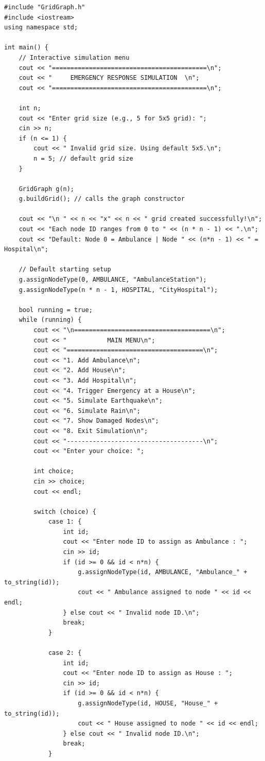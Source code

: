 \documentclass[12pt,a4paper]{report}
\begin{document}
\begin{lstlisting}[style=cpp, caption={main.cpp – Disaster Management System Simulation}]
#include "GridGraph.h"
#include <iostream>
using namespace std;

int main() {
    // Interactive simulation menu
    cout << "==========================================\n";
    cout << "     EMERGENCY RESPONSE SIMULATION  \n";
    cout << "==========================================\n";

    int n;
    cout << "Enter grid size (e.g., 5 for 5x5 grid): ";
    cin >> n;
    if (n <= 1) {
        cout << " Invalid grid size. Using default 5x5.\n";
        n = 5; // default grid size
    }

    GridGraph g(n);
    g.buildGrid(); // calls the graph constructor

    cout << "\n " << n << "x" << n << " grid created successfully!\n";
    cout << "Each node ID ranges from 0 to " << (n * n - 1) << ".\n";
    cout << "Default: Node 0 = Ambulance | Node " << (n*n - 1) << " = Hospital\n";

    // Default starting setup
    g.assignNodeType(0, AMBULANCE, "AmbulanceStation");
    g.assignNodeType(n * n - 1, HOSPITAL, "CityHospital");

    bool running = true;
    while (running) {
        cout << "\n=====================================\n";
        cout << "           MAIN MENU\n";
        cout << "=====================================\n";
        cout << "1. Add Ambulance\n";
        cout << "2. Add House\n";
        cout << "3. Add Hospital\n";
        cout << "4. Trigger Emergency at a House\n";
        cout << "5. Simulate Earthquake\n";
        cout << "6. Simulate Rain\n";
        cout << "7. Show Damaged Nodes\n";
        cout << "8. Exit Simulation\n";
        cout << "-------------------------------------\n";
        cout << "Enter your choice: ";

        int choice;
        cin >> choice;
        cout << endl;

        switch (choice) {
            case 1: {
                int id;
                cout << "Enter node ID to assign as Ambulance : ";
                cin >> id;
                if (id >= 0 && id < n*n) {
                    g.assignNodeType(id, AMBULANCE, "Ambulance_" + to_string(id));
                    cout << " Ambulance assigned to node " << id << endl;
                } else cout << " Invalid node ID.\n";
                break;
            }

            case 2: {
                int id;
                cout << "Enter node ID to assign as House : ";
                cin >> id;
                if (id >= 0 && id < n*n) {
                    g.assignNodeType(id, HOUSE, "House_" + to_string(id));
                    cout << " House assigned to node " << id << endl;
                } else cout << " Invalid node ID.\n";
                break;
            }


\end{lstlisting}
\end{document}
